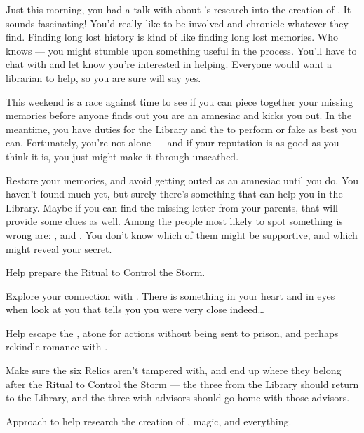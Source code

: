 \documentclass[char]{GL2020}
\begin{document}
Just this morning, you had a talk with \cBeetle{\intro} about \cEbbPriest{\intro}'s research into the creation of \pEarth{}. It sounds fascinating! You'd really like to be involved and chronicle whatever they find. Finding long lost history is kind of like finding long lost memories. Who knows — you might stumble upon something useful in the process. You'll have to chat with \cEbbPriest{} and let \cEbbPriest{\them} know you're interested in helping. Everyone would want a librarian to help, so you are sure \cEbbPriest{} will say yes.

This weekend is a race against time to see if you can piece together your missing memories before anyone finds out you are an amnesiac and kicks you out. In the meantime, you have duties for the Library and the \pSc{} to perform or fake as best you can. Fortunately, you're not alone — and if your reputation is as good as you think it is, you just might make it through unscathed.

\begin{itemz}
    \item Restore your memories, and avoid getting outed as an amnesiac until you do. You haven't found much yet, but surely there's something that can help you in the Library. Maybe if you can find the missing letter from your parents, that will provide some clues as well. Among the people most likely to spot something is wrong are: \cLibAssist{} \cPresident{}, \cAmbition{} and \cWildCard{}. You don’t know which of them might be supportive, and which might reveal your secret.
    \item Help prepare the Ritual to Control the Storm.
    \item Explore your connection with \cInterpol{}. There is something in your heart and in \cInterpol{\their} eyes when \cInterpol{\they} look\cInterpol{\verbs} at you that tells you you were very close indeed\ldots{}
    \item Help \cChupAvenger{} escape the \pGoaties{}, atone for \cChupAvenger{\their} actions without being sent to prison, and perhaps rekindle \cChupAvenger{\their} romance with \cHeadScientist{}.

\end{itemz}

\begin{itemz}
    \item Make sure the six Relics aren't tampered with, and end up where they belong after the Ritual to Control the Storm — the three from the Library should return to the Library, and the three with advisors should go home with those advisors.
    \item Approach \cEbbPriest{} to help research the creation of \pEarth{}, magic, and everything.
\end{itemz}
\end{document}
